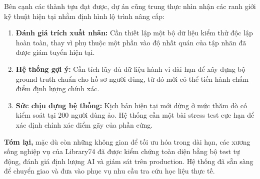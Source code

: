 Bên cạnh các thành tựu đạt được, dự án cũng trung thực nhìn nhận các ranh giới kỹ thuật hiện tại nhằm định hình lộ trình nâng cấp:
\begin{enumerate}
    \item \textbf{Đánh giá trích xuất nhãn:} Cần thiết lập một bộ dữ liệu kiểm thử độc lập hoàn toàn, thay vì phụ thuộc một phần vào độ nhất quán của tập nhãn đã được giám tuyển hiện tại.
    \item \textbf{Hệ thống gợi ý:} Cần tích lũy đủ dữ liệu hành vi dài hạn để xây dựng bộ ground truth chuẩn cho hồ sơ người dùng, từ đó mới có thể tiến hành chấm điểm định lượng chính xác.
    \item \textbf{Sức chịu đựng hệ thống:} Kịch bản hiện tại mới dừng ở mức thăm dò có kiểm soát tại 200 người dùng ảo. Hệ thống cần một bài stress test cực hạn để xác định chính xác điểm gãy của phần cứng.
\end{enumerate}

\textbf{Tóm lại,} mặc dù còn những không gian để tối ưu hóa trong dài hạn, các xương sống nghiệp vụ của Library74 đã được kiểm chứng toàn diện bằng bộ test tự động, đánh giá định lượng AI và giám sát trên production. Hệ thống đã sẵn sàng để chuyển giao và đưa vào phục vụ nhu cầu tra cứu học liệu thực tế.
